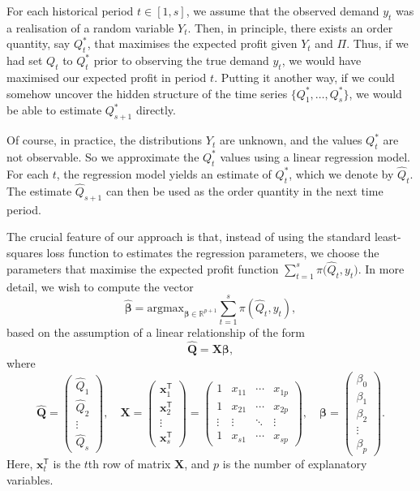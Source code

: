 \documentclass{article}
\begin{document}
For each historical period $t\in [1,s]$, we assume that the observed demand $y_t$ was a realisation of a random variable $Y_t$. Then, in principle, there exists an order quantity, say $Q_t^*$, that maximises the expected profit given $Y_t$ and $\Pi$. Thus, if we had set $Q_t$ to $Q_t^*$ prior to observing the true demand $y_t$, we would have maximised our expected profit in period $t$. Putting it another way, if we could somehow uncover the hidden structure of the time series $\big\{ Q_1^*,\dots,Q_s^* \big\}$, we would be able to estimate $Q_{s+1}^*$ directly.

Of course, in practice, the distributions $Y_t$ are unknown, and the values $Q_t^*$ are not observable. So we approximate the $Q_t^*$ values using a linear regression model. For each $t$, the regression model yields an estimate of $Q^*_t$, which we denote by $\hat{Q}_t$. The estimate $\hat{Q}_{s+1}$ can then be used as the order quantity in the next time period.

The crucial feature of our approach is that, instead of using the standard least-squares loss function to estimates the regression parameters, we choose the parameters that maximise the expected profit function $\sum_{t=1}^s{\pi \big( \hat{Q}_t,y_t \big)}$. In more detail, we wish to compute the vector
\[
    \hat{\boldsymbol{\beta}}=\text{argmax}_{\boldsymbol{\beta}\in \mathbb{R}^{p+1}}\displaystyle\sum_{t=1}^s{\pi(\hat{Q}_t,y_t)},
\]
based on the assumption of a linear relationship of the form
\[
    \mathbf{\hat{Q}}=\mathbf{X}\boldsymbol{\beta},
\]
where
\[
    \mathbf{\hat{Q}}=
    \begin{pmatrix}
        \hat{Q}_1\\
        \hat{Q}_2\\
        \vdots\\
        \hat{Q}_s
    \end{pmatrix}, \quad
    \mathbf{X}=
    \begin{pmatrix}
        \mathbf{x}_1^{\mathsf{T}}\\
        \mathbf{x}_2^{\mathsf{T}}\\
        \vdots\\
        \mathbf{x}_s^{\mathsf{T}}
    \end{pmatrix}=
    \begin{pmatrix}
        1&x_{11}&\cdots &x_{1p}\\
        1&x_{21}&\cdots &x_{2p}\\
        \vdots &\vdots &\ddots &\vdots \\
        1&x_{s1}&\cdots &x_{sp}
    \end{pmatrix}, \quad
    \boldsymbol{\beta}=
    \begin{pmatrix}
        \beta_0\\
        \beta_1\\
        \beta_2\\
        \vdots\\
        \beta_{p}
    \end{pmatrix}.
\]
Here, $\mathbf{x}_t^{\mathsf{T}}$ is the $t$th row of matrix $\mathbf{X}$,
and $p$ is the number of explanatory variables.
\end{document}
